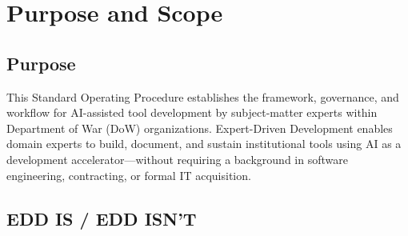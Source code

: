 \documentclass[11pt,letterpaper]{article}
\begin{document}
\newpage

\tableofcontents
\newpage

\section{Purpose and Scope}
\label{sec:purpose-and-scope}

\subsection{Purpose}
\label{sec:purpose}

This Standard Operating Procedure establishes the framework, governance, and workflow for
AI-assisted tool development by subject-matter experts within Department of War (DoW) organizations.
Expert-Driven Development enables domain experts to build, document, and sustain institutional
tools using AI as a development accelerator---without requiring a background in software engineering,
contracting, or formal IT acquisition.

\subsection{EDD IS / EDD ISN'T}
\label{sec:is-isnt}
\end{document}
